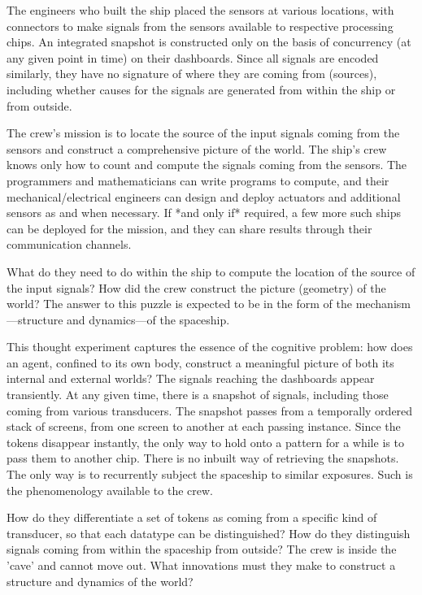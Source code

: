 The engineers who built the ship placed the sensors at various locations, with connectors to make signals from the sensors available to respective processing chips. An integrated snapshot is constructed only on the basis of concurrency (at any given point in time) on their dashboards. Since all signals are encoded similarly, they have no signature of where they are coming from (sources), including whether causes for the signals are generated from within the ship or from outside.

The crew's mission is to locate the source of the input signals coming from the sensors and construct a comprehensive picture of the world. The ship's crew knows only how to count and compute the signals coming from the sensors. The programmers and mathematicians can write programs to compute, and their mechanical/electrical engineers can design and deploy actuators and additional sensors as and when necessary. If *and only if* required, a few more such ships can be deployed for the mission, and they can share results through their communication channels.

What do they need to do within the ship to compute the location of the source of the input signals? How did the crew construct the picture (geometry) of the world? The answer to this puzzle is expected to be in the form of the mechanism—structure and dynamics—of the spaceship.

This thought experiment captures the essence of the cognitive problem: how does an agent, confined to its own body, construct a meaningful picture of both its internal and external worlds? The signals reaching the dashboards appear transiently. At any given time, there is a snapshot of signals, including those coming from various transducers. The snapshot passes from a temporally ordered stack of screens, from one screen to another at each passing instance. Since the tokens disappear instantly, the only way to hold onto a pattern for a while is to pass them to another chip. There is no inbuilt way of retrieving the snapshots. The only way is to recurrently subject the spaceship to similar exposures. Such is the phenomenology available to the crew.

How do they differentiate a set of tokens as coming from a specific kind of transducer, so that each datatype can be distinguished? How do they distinguish signals coming from within the spaceship from outside? The crew is inside the 'cave' and cannot move out. What innovations must they make to construct a structure and dynamics of the world?


